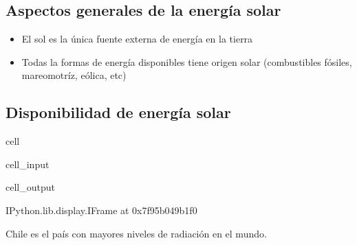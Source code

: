 \documentclass[letterpaper,10pt,english]{jupyterBook}
\begin{document}
\subsection{Aspectos generales de la energía solar}
\label{\detokenize{0_introduccion/0_introduccion:aspectos-generales-de-la-energia-solar}}\begin{itemize}
\item {} 
\sphinxAtStartPar
El sol es la única fuente externa de energía en la tierra

\item {} 
\sphinxAtStartPar
Todas la formas de energía disponibles tiene origen solar (combustibles fósiles, mareomotríz, eólica, etc)

\end{itemize}


\subsection{Disponibilidad de energía solar}
\label{\detokenize{0_introduccion/0_introduccion:disponibilidad-de-energia-solar}}
\begin{sphinxuseclass}{cell}\begin{sphinxVerbatimInput}

\begin{sphinxuseclass}{cell_input}
\begin{sphinxVerbatim}[commandchars=\\\{\}]
\end{sphinxVerbatim}

\end{sphinxuseclass}\end{sphinxVerbatimInput}
\begin{sphinxVerbatimOutput}

\begin{sphinxuseclass}{cell_output}
\begin{sphinxVerbatim}[commandchars=\\\{\}]
\PYGZlt{}IPython.lib.display.IFrame at 0x7f95b049b1f0\PYGZgt{}
\end{sphinxVerbatim}

\end{sphinxuseclass}\end{sphinxVerbatimOutput}

\end{sphinxuseclass}
\sphinxAtStartPar
Chile es el país con mayores niveles de radiación en el mundo.
\end{document}
